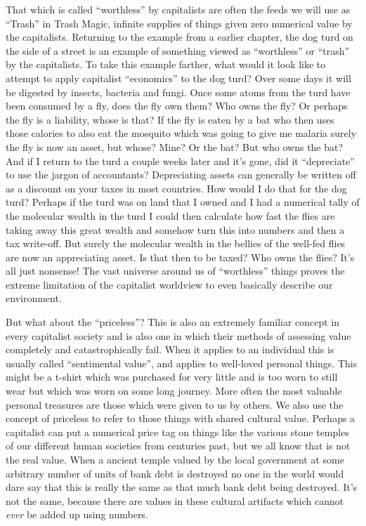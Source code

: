 That which is called ``worthless'' by capitalists are often the feeds we
will use as ``Trash'' in Trash Magic, infinite supplies of things given
zero numerical value by the capitalists. Returning to the example from a
earlier chapter, the dog turd on the side of a street is an example of
something viewed as ``worthless'' or ``trash'' by the capitalists. To
take this example farther, what would it look like to attempt to apply
capitalist ``economics'' to the dog turd? Over some days it will be
digested by insects, bacteria and fungi. Once some atoms from the turd
have been consumed by a fly, does the fly own them? Who owns the fly? Or
perhaps the fly is a liability, whose is that? If the fly is eaten by a
bat who then uses those calories to also eat the mosquito which was
going to give me malaria surely the fly is now an asset, but whose?
Mine? Or the bat? But who owns the bat? And if I return to the turd a
couple weeks later and it's gone, did it ``depreciate'' to use the
jargon of accountants? Depreciating assets can generally be written off
as a discount on your taxes in most countries. How would I do that for
the dog turd? Perhaps if the turd was on land that I owned and I had a
numerical tally of the molecular wealth in the turd I could then
calculate how fast the flies are taking away this great wealth and
somehow turn this into numbers and then a tax write-off. But surely the
molecular wealth in the bellies of the well-fed flies are now an
appreciating asset. Is that then to be taxed? Who owns the flies? It's
all just nonsense! The vast universe around us of ``worthless'' things
proves the extreme limitation of the capitalist worldview to even
basically describe our environment.

But what about the ``priceless''? This is also an extremely familiar
concept in every capitalist society and is also one in which their
methods of assessing value completely and catastrophically fail. When it
applies to an individual this is usually called ``sentimental value'',
and applies to well-loved personal things. This might be a t-shirt which
was purchased for very little and is too worn to still wear but which
was worn on some long journey. More often the most valuable personal
treasures are those which were given to us by others. We also use the
concept of priceless to refer to those things with shared cultural
value. Perhaps a capitalist can put a numerical price tag on things like
the various stone temples of our different human societies from
centuries past, but we all know that is not the real value. When a
ancient temple valued by the local government at some arbitrary number
of units of bank debt is destroyed no one in the world would dare say
that this is really the same as that much bank debt being destroyed.
It's not the same, because there are values in these cultural artifacts
which cannot \emph{ever} be added up using numbers.

